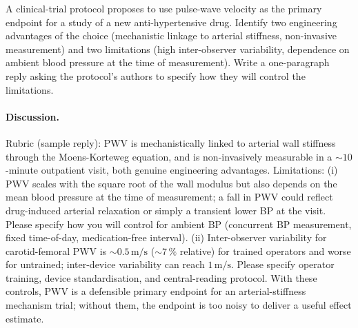 \begin{exercise}
A clinical-trial protocol proposes to use pulse-wave velocity as the
primary endpoint for a study of a new anti-hypertensive drug.
Identify two engineering advantages of the choice (mechanistic
linkage to arterial stiffness, non-invasive measurement) and two
limitations (high inter-observer variability, dependence on
ambient blood pressure at the time of measurement). Write a
one-paragraph reply asking the protocol's authors to specify how
they will control the limitations.
\end{exercise}

\paragraph{Discussion.}
Rubric (sample reply): PWV is mechanistically linked to arterial
wall stiffness through the Moens-Korteweg equation, and is
non-invasively measurable in a $\sim 10$-minute outpatient visit,
both genuine engineering advantages. Limitations: (i) PWV scales
with the square root of the wall modulus but also depends on the
mean blood pressure at the time of measurement; a fall in PWV could
reflect drug-induced arterial relaxation or simply a transient
lower BP at the visit. Please specify how you will control for
ambient BP (concurrent BP measurement, fixed time-of-day,
medication-free interval). (ii) Inter-observer variability for
carotid-femoral PWV is $\sim 0.5\,\text{m/s}$ ($\sim 7\,\%$
relative) for trained operators and worse for untrained;
inter-device variability can reach $1\,\text{m/s}$. Please specify
operator training, device standardisation, and central-reading
protocol. With these controls, PWV is a defensible primary endpoint
for an arterial-stiffness mechanism trial; without them, the
endpoint is too noisy to deliver a useful effect estimate.
